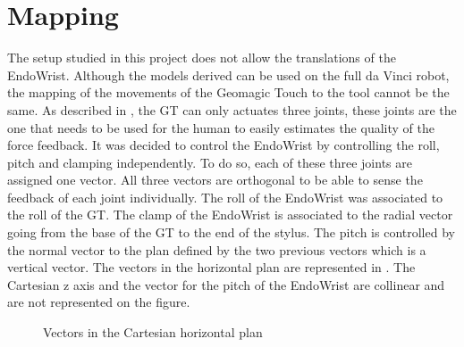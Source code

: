 \section{Mapping}

The setup studied in this project does not allow the translations of the EndoWrist. Although the models derived can be used on the full da Vinci robot, the mapping of the movements of the Geomagic Touch to the tool cannot be the same. As described in , the GT can only actuates three joints, these joints are the one that needs to be used for the human to easily estimates the quality of the force feedback. It was decided to control the EndoWrist by controlling the roll, pitch and clamping independently. To do so, each of these three joints are assigned one vector. All three vectors are orthogonal to be able to sense the feedback of each joint individually.
The roll of the EndoWrist was associated to the roll of the GT. The clamp of the EndoWrist is associated to the radial vector going from the base of the GT to the end of the stylus. The pitch is controlled by the normal vector to the plan defined by the two previous vectors which is a vertical vector. The vectors in the horizontal plan are represented in . The Cartesian z axis and the vector for the pitch of the EndoWrist are collinear and are not represented on the figure.
\\

\begin{figure}[H]
\centering
{}
\caption{Vectors in the Cartesian horizontal plan}
\label{fig:cartesian_polar}
\end{figure}

